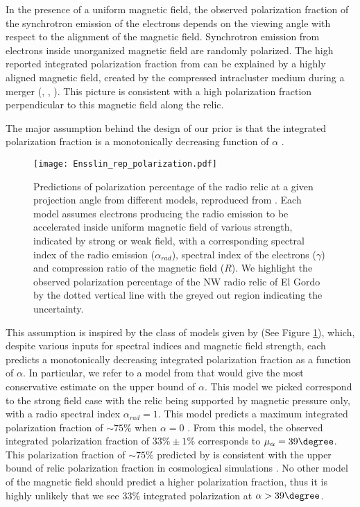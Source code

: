 In the presence of a uniform magnetic field, the observed polarization
fraction of the synchrotron emission of the electrons depends on the
viewing angle with respect to the alignment of the magnetic field. 
Synchrotron emission from electrons inside unorganized magnetic field are
randomly polarized. The high reported integrated polarization fraction from
\citet{L13} can be explained by a highly aligned magnetic field,
created by the compressed intracluster medium during a merger
(\citealt{E98}, \citealt{vanWeeren10}, \citealt{Feretti12}).
This picture is consistent with a high polarization fraction perpendicular
to this magnetic field along the relic. 
\par
The major assumption behind the design of our prior
is that the integrated polarization fraction is a monotonically
decreasing function of $\alpha$ . 
\begin{figure}
	\texttt{[image: Ensslin\_rep\_polarization.pdf]}
	\caption{Predictions of polarization percentage of the radio relic at a
		given projection angle from different models, reproduced from
		\citealt{E98}. Each model assumes electrons producing the radio emission
		to be accelerated inside
		uniform magnetic field of various strength, indicated by strong or weak
		field, with a corresponding spectral index of the radio emission
		($\alpha_{rad}$), spectral index of the electrons ($\gamma$) and
		compression ratio of the magnetic field ($R$).
		We highlight the observed polarization percentage of the NW radio relic
		of El Gordo by the dotted vertical line with the greyed out region
		indicating the uncertainty.\label{fig:Ensslin_fig}}
\end{figure}
This assumption is inspired by the class of models given by \cite{E98}(See Figure \ref{fig:Ensslin_fig}), 
which, despite various inputs for spectral indices and magnetic field strength, each predicts a monotonically decreasing integrated
polarization fraction as a function of $\alpha$. 
In particular, we refer to a model from \cite{E98} that would give the most
conservative estimate on the upper bound of $\alpha$. This model we picked
correspond to the strong field case with the relic being supported by
magnetic pressure only, with a radio spectral index $\alpha_{rad} = 1$. 
This model predicts a maximum integrated polarization fraction of
$\sim75\%$ when $\alpha = 0$ . From this model, the observed integrated
polarization fraction of $33\%\pm1\%$ corresponds to $\mu_\alpha =
39\degree$. 
This  polarization fraction of $\sim 75\%$ predicted by \citep{E98} is
consistent with the upper bound of relic polarization fraction in cosmological
simulations \citep{S13}. No other model of the magnetic field should predict a higher polarization fraction, thus it is highly unlikely that we see 33\%
integrated polarization at $\alpha > 39\degree$.  
\par

